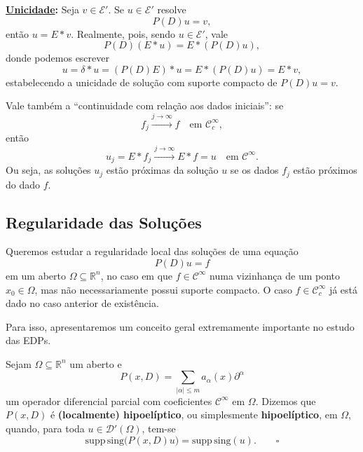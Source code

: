 \documentclass[../distribution_theory_notes.tex]{subfiles}
\begin{document}
\noindent\textbf{\underline{Unicidade}:} Seja \(v\in\mathcal{E}'\). Se \(u\in\mathcal{E}'\) resolve
\[
	P(D)u=v,
\]
então \(u=E*v\). Realmente, pois, sendo \(u\in\mathcal{E}'\), vale
\[
	P(D)(E*u)=E*(P(D)u),
\]
donde podemos escrever
\[
	u=\delta*u=(P(D)E)*u=E*(P(D)u)=E*v,
\]
estabelecendo a unicidade de solução com suporte compacto de \(P(D)u=v\).

\begin{tcolorbox}[
		skin=enhanced,
		title=Observação,
		fonttitle=\bfseries,
		colframe=black,
		colbacktitle=cyan!75!white,
		colback=cyan!15,
		colbacklower=black,
		coltitle=black,
		drop fuzzy shadow,
	]
	Vale também a ``continuidade com relação aos dados iniciais'': se
	\[
		f_{j}\stackrel{j\to\infty}{\longrightarrow}f
		\quad\text{em }\mathcal{C}_{c}^{\infty},
	\]
	então
	\[
		u_{j}=E*f_{j}
		\stackrel{j\to\infty}{\longrightarrow}
		E*f=u
		\quad\text{em }\mathcal{C}^{\infty}.
	\]
	Ou seja, as soluções \(u_{j}\) estão próximas da solução \(u\) se os dados \(f_{j}\) estão próximos do dado \(f\).
\end{tcolorbox}

\subsection{Regularidade das Soluções}
Queremos estudar a regularidade local das soluções de uma equação
\[
	P(D)u=f
\]
em um aberto \(\Omega\subseteq\mathbb{R}^{n}\), no caso em que \(f\in\mathcal{C}^{\infty}\) numa vizinhança de um ponto \(x_{0}\in\Omega\), mas não necessariamente possui suporte compacto. O caso \(f\in\mathcal{C}_{c}^{\infty}\) já está dado no caso anterior de existência.

Para isso, apresentaremos um conceito geral extremamente importante no estudo das EDPs.

\begin{def*}
	Sejam \(\Omega\subseteq\mathbb{R}^{n}\) um aberto e
	\[
		P(x,D)=\sum_{|\alpha|\leq m}a_{\alpha}(x)\partial^{\alpha}
	\]
	um operador diferencial parcial com coeficientes \(\mathcal{C}^{\infty}\) em \(\Omega\). Dizemos que \(P(x,D)\) é \textbf{(localmente) hipoelíptico}, ou simplesmente \textbf{hipoelíptico}, em \(\Omega\), quando, para toda \(u\in\mathcal{D}'(\Omega)\), tem-se
	\[
		\mathrm{supp\,sing}\bigl(P(x,D)u\bigr)
		=\mathrm{supp\,sing}(u).\qquad \square
	\]
\end{def*}
\end{document}
